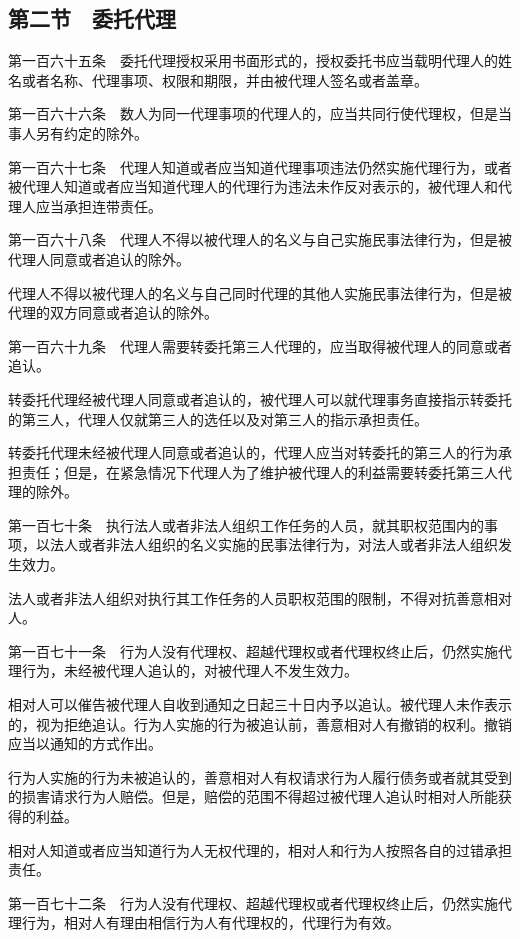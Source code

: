 \documentclass[UTF8,12pt,a4paper]{ctexbook}
\begin{document}
\subsection*{第二节　委托代理}

第一百六十五条　委托代理授权采用书面形式的，授权委托书应当载明代理人的姓名或者名称、代理事项、权限和期限，并由被代理人签名或者盖章。

第一百六十六条　数人为同一代理事项的代理人的，应当共同行使代理权，但是当事人另有约定的除外。

第一百六十七条　代理人知道或者应当知道代理事项违法仍然实施代理行为，或者被代理人知道或者应当知道代理人的代理行为违法未作反对表示的，被代理人和代理人应当承担连带责任。

第一百六十八条　代理人不得以被代理人的名义与自己实施民事法律行为，但是被代理人同意或者追认的除外。

代理人不得以被代理人的名义与自己同时代理的其他人实施民事法律行为，但是被代理的双方同意或者追认的除外。

第一百六十九条　代理人需要转委托第三人代理的，应当取得被代理人的同意或者追认。

转委托代理经被代理人同意或者追认的，被代理人可以就代理事务直接指示转委托的第三人，代理人仅就第三人的选任以及对第三人的指示承担责任。

转委托代理未经被代理人同意或者追认的，代理人应当对转委托的第三人的行为承担责任；但是，在紧急情况下代理人为了维护被代理人的利益需要转委托第三人代理的除外。

第一百七十条　执行法人或者非法人组织工作任务的人员，就其职权范围内的事项，以法人或者非法人组织的名义实施的民事法律行为，对法人或者非法人组织发生效力。

法人或者非法人组织对执行其工作任务的人员职权范围的限制，不得对抗善意相对人。

第一百七十一条　行为人没有代理权、超越代理权或者代理权终止后，仍然实施代理行为，未经被代理人追认的，对被代理人不发生效力。

相对人可以催告被代理人自收到通知之日起三十日内予以追认。被代理人未作表示的，视为拒绝追认。行为人实施的行为被追认前，善意相对人有撤销的权利。撤销应当以通知的方式作出。

行为人实施的行为未被追认的，善意相对人有权请求行为人履行债务或者就其受到的损害请求行为人赔偿。但是，赔偿的范围不得超过被代理人追认时相对人所能获得的利益。

相对人知道或者应当知道行为人无权代理的，相对人和行为人按照各自的过错承担责任。

第一百七十二条　行为人没有代理权、超越代理权或者代理权终止后，仍然实施代理行为，相对人有理由相信行为人有代理权的，代理行为有效。
\end{document}

